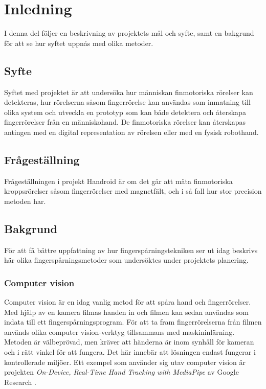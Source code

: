 \documentclass[a4paper]{article}
\begin{document}
\begin{sloppypar}

    \section{Inledning}
    I denna del följer en beskrivning av projektets mål och syfte, samt en bakgrund för att se hur syftet uppnås med olika metoder.
    \subsection{Syfte}
    Syftet med projektet är att undersöka hur människan finmotoriska rörelser kan detekteras, hur rörelserna såsom fingerrörelse kan användas som inmatning till olika system
    och utveckla en prototyp som kan både detektera och återskapa fingerrörelser från en människohand.
    De finmotoriska rörelser kan återskapas antingen med en digital representation av rörelsen eller med en fysisk robothand.

    \subsection{Frågeställning}
    Frågeställningen i projekt Handroid är om det går att mäta finmotoriska kroppsrörelser såsom fingerrörelser med magnetfält, och i så fall hur stor precision metoden har.

    \subsection{Bakgrund}
    För att få bättre uppfattning av hur fingerspårningstekniken ser ut idag beskrivs här olika fingerspårningsmetoder som undersöktes under projektets planering.

    \subsubsection{Computer vision}
    Computer vision är en idag vanlig metod för att spåra hand och fingerrörelser. Med hjälp av en kamera filmas handen in och filmen kan sedan användas som indata till ett fingerspårningsprogram.
    För att ta fram fingerrörelserna från filmen används olika computer vision-verktyg tillsammans med maskininlärning. Metoden är välbeprövad, men kräver  att
    händerna är inom synhåll för kameran och i rätt vinkel för att fungera. Det här innebär att lösningen endast fungerar
    i kontrollerade miljöer. Ett exempel som använder sig utav computer vision är projekten \textit{On-Device, Real-Time Hand Tracking with MediaPipe}
    av Google Research \cite{google:Hand_Tracking}.


\end{sloppypar}
\end{document}
